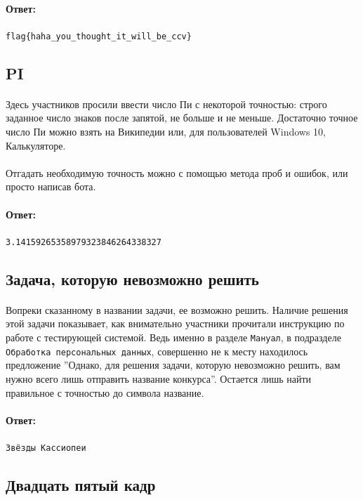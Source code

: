\documentclass[12pt]{article}
\begin{document}
    \paragraph{Ответ:}
    \verb|flag{haha_you_thought_it_will_be_ccv}|

    \subsection{PI}
	\paragraph{}
    Здесь участников просили ввести число Пи с некоторой точностью:
	строго заданное число знаков после запятой, не больше и не меньше.
	Достаточно точное число Пи можно взять на Википедии или, для пользователей Windows 10, Калькуляторе.
    \paragraph{}
    Отгадать необходимую точность можно с помощью метода проб и ошибок, или просто написав бота.
    \paragraph{Ответ:}
    \verb|3.14159265358979323846264338327|

    \subsection{Задача, которую невозможно решить}
	\paragraph{}
    Вопреки сказанному в названии задачи, ее возможно решить.
	Наличие решения этой задачи показывает,
	как внимательно участники прочитали инструкцию по работе с тестирующей системой.
	Ведь именно в разделе \verb|Мануал|, в подразделе \verb|Обработка персональных данных|,
	совершенно не к месту находилось предложение
    ''Однако, для решения задачи, которую невозможно решить, вам нужно всего лишь отправить название конкурса''.
	Остается лишь найти правильное с точностью до символа название.
    \paragraph{Ответ:}
    \verb|Звёзды Кассиопеи|

    \subsection{Двадцать пятый кадр}
\end{document}
